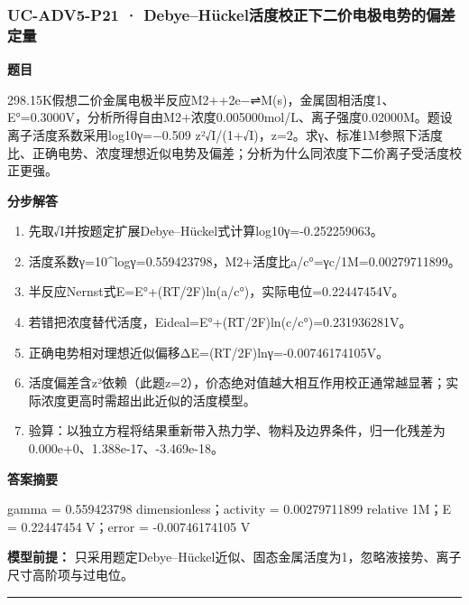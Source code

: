 \documentclass[UTF8,11pt,a4paper]{ctexart}
\begin{document}
\subsubsection*{UC-ADV5-P21 · Debye–Hückel活度校正下二价电极电势的偏差定量}
\noindent\textbf{题目}\par
298.15K假想二价金属电极半反应M2++2e−⇌M(s)，金属固相活度1、E°=0.3000V，分析所得自由M2+浓度0.005000mol/L、离子强度0.02000M。题设离子活度系数采用log10γ=−0.509 z²√I/(1+√I)，z=2。求γ、标准1M参照下活度比、正确电势、浓度理想近似电势及偏差；分析为什么同浓度下二价离子受活度校正更强。\par
\medskip\noindent\textbf{分步解答}
\begin{enumerate}
\item 先取√I并按题定扩展Debye–Hückel式计算log10γ=-0.252259063。
\item 活度系数γ=10\textasciicircum{}logγ=0.559423798，M2+活度比a/c°=γc/1M=0.00279711899。
\item 半反应Nernst式E=E°+(RT/2F)ln(a/c°)，实际电位=0.22447454V。
\item 若错把浓度替代活度，Eideal=E°+(RT/2F)ln(c/c°)=0.231936281V。
\item 正确电势相对理想近似偏移ΔE=(RT/2F)lnγ=-0.00746174105V。
\item 活度偏差含z²依赖（此题z=2），价态绝对值越大相互作用校正通常越显著；实际浓度更高时需超出此近似的活度模型。
\item 验算：以独立方程将结果重新带入热力学、物料及边界条件，归一化残差为 0.000e+0、1.388e-17、-3.469e-18。
\end{enumerate}
\noindent\textbf{答案摘要}\par
gamma = 0.559423798 dimensionless；activity = 0.00279711899 relative 1M；E = 0.22447454 V；error = -0.00746174105 V\par
\noindent\textbf{模型前提：}
只采用题定Debye–Hückel近似、固态金属活度为1，忽略液接势、离子尺寸高阶项与过电位。\par
\medskip\hrule\medskip
{}
\end{document}
